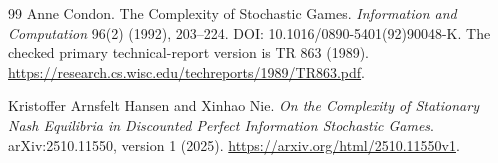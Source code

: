 \documentclass[11pt,a4paper]{article}
\theoremstyle{definition}
\theoremstyle{remark}
\begin{document}
\begin{thebibliography}{99}
\small
{}
Anne Condon. The Complexity of Stochastic Games.
\emph{Information and Computation} 96(2) (1992), 203--224.
DOI: 10.1016/0890-5401(92)90048-K. The checked primary technical-report version is TR 863 (1989).
\url{https://research.cs.wisc.edu/techreports/1989/TR863.pdf}.

Kristoffer Arnsfelt Hansen and Xinhao Nie.
\emph{On the Complexity of Stationary Nash Equilibria in Discounted Perfect Information Stochastic Games}.
arXiv:2510.11550, version 1 (2025).
\url{https://arxiv.org/html/2510.11550v1}.

\end{thebibliography}
\end{document}
